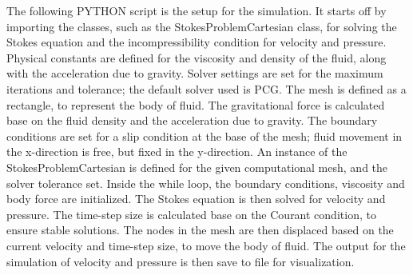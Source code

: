The following PYTHON script is the setup for the simulation. It starts off by importing the classes, such as the StokesProblemCartesian class, for solving the Stokes equation and the incompressibility condition for velocity and pressure. Physical constants are defined for the viscosity and density of the fluid, along with the acceleration due to gravity. Solver settings are set for the maximum iterations and tolerance; the default solver used is PCG. The mesh is defined as a rectangle, to represent the body of fluid. The gravitational force is calculated base on the fluid density and the acceleration due to gravity. The boundary conditions are set for a slip condition at the base of the mesh; fluid movement in the x-direction is free, but fixed in the y-direction. An instance of the StokesProblemCartesian is defined for the given computational mesh, and the solver tolerance set. Inside the while loop, the boundary conditions, viscosity and body force are initialized. The Stokes equation is then solved for velocity and pressure. The time-step size is calculated base on the Courant condition, to ensure stable solutions. The nodes in the mesh are then displaced based on the current velocity and time-step size, to move the body of fluid. The output for the simulation of velocity and pressure is then save to file for visualization. 
%
